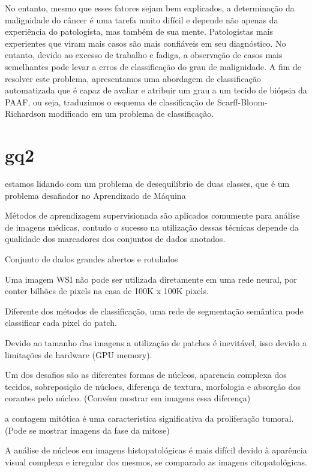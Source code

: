 \documentclass[preprint,12pt,authoryear]{elsarticle}
\begin{document}
  No entanto, mesmo que esses fatores sejam bem explicados, a determinação da malignidade do câncer é uma tarefa muito difícil e depende não apenas da experiência do patologista, mas também de sua mente. Patologistas mais experientes que viram mais casos são mais confiáveis ​​em seu diagnóstico. No entanto, devido ao excesso de trabalho e fadiga, a observação de casos mais semelhantes pode levar a erros de classificação do grau de malignidade. A fim de resolver este problema, apresentamos uma abordagem de classificação automatizada que é capaz de avaliar e atribuir um grau a um tecido de biópsia da PAAF, ou seja, traduzimos o esquema de classificação de Scarff-Bloom-Richardson modificado em um problema de classificação. \cite{KRAWCZYK2016}
  
  
  \section{gq2}
  
  \cite{KRAWCZYK2016} estamos lidando com um problema de desequilíbrio de duas classes, que é um problema desafiador no Aprendizado de Máquina

\cite{GUO2019} Métodos de aprendizagem supervisionada são aplicados comumente para análise de imagens médicas, contudo o sucesso na utilização dessas técnicas depende da qualidade dos marcadores dos conjuntos de dados anotados.

Conjunto de dados grandes abertos e rotulados

Uma imagem WSI não pode ser utilizada diretamente em uma rede neural, por conter bilhões de pixels na casa de 100K x 100K pixels.

Diferente dos métodos de classificação, uma rede de segmentação semântica pode classificar cada pixel do patch.

\cite{YAN2019} Devido ao tamanho das imagens a utilização de patches é inevitável, isso devido a limitações de hardware (GPU memory).

\cite{MITTAL2019} Um dos desafios são as diferentes formas de núcleos, aparencia complexa dos tecidos, sobreposição de núcloes, diferença de textura, morfologia e absorção dos corantes pelo núcleo. (Convém mostrar em imagens essa diferença)

\cite{SABEENABEEVI2019} a contagem mitótica é uma característica significativa da proliferação tumoral. (Pode se mostrar imagens da fase da mitose)

A análise de núcleos em imagens histopatológicas é mais difícil devido à aparência visual complexa e irregular dos mesmos, se comparado as imagens citopatológicas.
\end{document}
